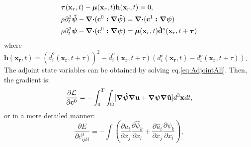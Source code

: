 \begin{equation}
	\begin{split}
		&\boldsymbol{{}\tau}(\mathbf{x}_r,t)-\boldsymbol{{}\mu}(\mathbf{x}_r,t)\mathbf{h}(\mathbf{x}_r,t)
	=0,\\
	&\rho\partial^2_t \boldsymbol{{}\hat \psi} -\boldsymbol{{}\nabla\cdot}
	(\boldsymbol{{}\mathbf{c}}^0\boldsymbol{{}:\nabla\boldsymbol{{}\hat
	\psi}})=\boldsymbol{{}\nabla\cdot}(\boldsymbol{{}\mathbf{c}}^1\boldsymbol{{}:\nabla\psi})\\
	&\rho\partial^2_t
	\boldsymbol{{}\psi}-\boldsymbol{{}\nabla\cdot}(\boldsymbol{{}\mathbf{c}}^0\boldsymbol{{}:\nabla\boldsymbol{{}\psi}})
	=\boldsymbol{{}\mu}(\mathbf{x}_r,t)\mathbf{\dot{d}}^o(\mathbf{x}_r,t+\boldsymbol{{}\tau})	\\
	\end{split}
        \label{eq:AdjointAll}
\end{equation}
where 
$\mathbf{h}(\mathbf{x_r},t)=(\dot{d}^o_i(\mathbf{x_r},t+\tau))^2-\ddot{d}^o_i(\mathbf{x_r},t+\tau)
(d^c_i(\mathbf{x_r},t)-d^o_i(\mathbf{x_r},t+\tau))$.
The adjoint state variables can be obtained by solving eq.\eqref{eq:AdjointAll}. Then, the gradient
is: 
\begin{equation}
	\frac{\partial \mathcal{L}}{\partial \mathbf{c}^0}=-\int^T_0\int_{\Omega}[\boldsymbol{{}\nabla\hat \psi} \boldsymbol{{}\nabla\mathbf{u}}+
	\boldsymbol{{}\nabla\psi}\boldsymbol{{}\nabla\mathbf{\hat{u}}}]d^3\mathbf{x}dt,
\end{equation}
or in a more detailed manner:
\begin{equation}
	\frac{\partial E}{\partial c^0_{ijkl}}=-\int (\frac{\partial u_{i}}{\partial
	x_j}\frac{\partial \hat \psi_{k}}{\partial x_l}+\frac{\partial \hat{u}_{i}}{\partial
	x_j}\frac{\partial \psi_{k}}{\partial x_l}),
    \label{eq:GradientCijkl_app}
\end{equation}

